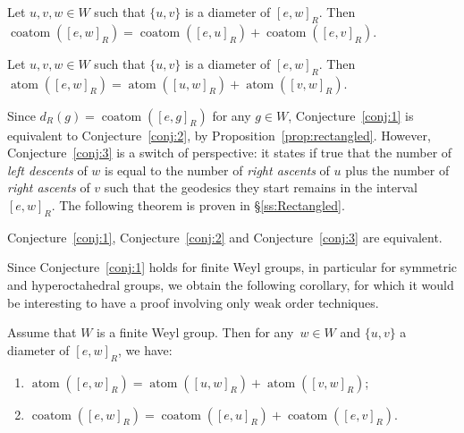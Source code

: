 \documentclass[ALCO,Unicode]{cedram}
\theoremstyle{definition}
\newcommand{\coatom}{\operatorname{coatom}}
\newcommand{\atom}{\operatorname{atom}}
\begin{document}
\begin{conj}\label{conj:2} Let $u,v,w\in W$ such that $\{u,v\}$ is a diameter of $[e,w]_R$. Then $\coatom([e,w]_R)= \coatom([e,u]_R) + \coatom([e,v]_R)$.
\end{conj} 

\begin{conj}\label{conj:3} Let $u,v,w\in W$ such that $\{u,v\}$ is a diameter of $[e,w]_R$. Then $\atom([e,w]_R)= \atom([u,w]_R) + \atom([v,w]_R)$.
\end{conj} 

Since $d_R(g)=\coatom([e,g]_R)$ for any $g\in W$, Conjecture~\ref{conj:1} is equivalent to Conjecture~\ref{conj:2}, by Proposition~\ref{prop:rectangled}. However, Conjecture~\ref{conj:3} is a switch of perspective: it states if true that the number of {\em left descents} of $w$ is equal to the number of {\em right ascents} of $u$ plus the number of {\em right ascents} of $v$ such that the geodesics they start remains in the interval $[e,w]_R$. The following theorem is proven in \S\ref{ss:Rectangled}.

\begin{thm}\label{thm:Equivalent} Conjecture~\ref{conj:1}, Conjecture~\ref{conj:2} and Conjecture~\ref{conj:3} are equivalent. 
\end{thm}

Since Conjecture~\ref{conj:1} holds for finite Weyl groups, in particular for symmetric and hyperoctahedral groups,  we obtain the following corollary, for which it would be interesting to have a proof involving only weak order techniques.

\begin{coro} Assume that $W$ is a finite Weyl group. Then for any~$w\in  W$ and $\{u,v\}$ a  diameter of $[e,w]_R$, we have:
\begin{enumerate}
\item $\atom([e,w]_R)= \atom([u,w]_R) + \atom([v,w]_R)$;
\item $\coatom([e,w]_R)= \coatom([e,u]_R) + \coatom([e,v]_R)$.
\end{enumerate}
\end{coro}
\end{document}
